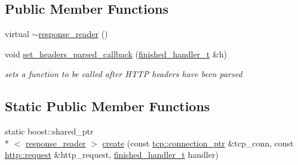 \subsection*{Public Member Functions}
\begin{DoxyCompactItemize}
\item 
virtual \hyperlink{classpion_1_1http_1_1response__reader_a4917191c842368a4be4c9e72927044ce}{$\sim$response\-\_\-reader} ()
\item 
void \hyperlink{classpion_1_1http_1_1response__reader_acbf0d25e943c1947a928970792b6a273}{set\-\_\-headers\-\_\-parsed\-\_\-callback} (\hyperlink{classpion_1_1http_1_1response__reader_a5ca8a2f566ad6c5f6c6ae264d557944e}{finished\-\_\-handler\-\_\-t} \&h)
\begin{DoxyCompactList}\small\item\em sets a function to be called after H\-T\-T\-P headers have been parsed \end{DoxyCompactList}\end{DoxyCompactItemize}
\subsection*{Static Public Member Functions}
\begin{DoxyCompactItemize}
\item 
static boost\-::shared\-\_\-ptr\\*
$<$ \hyperlink{classpion_1_1http_1_1response__reader}{response\-\_\-reader} $>$ \hyperlink{classpion_1_1http_1_1response__reader_af6fc5c10d090264225b72540c2c977b8}{create} (const \hyperlink{namespacepion_1_1tcp_a6c9b7497068009f6d81d95ec0b0627d6}{tcp\-::connection\-\_\-ptr} \&tcp\-\_\-conn, const \hyperlink{classpion_1_1http_1_1request}{http\-::request} \&http\-\_\-request, \hyperlink{classpion_1_1http_1_1response__reader_a5ca8a2f566ad6c5f6c6ae264d557944e}{finished\-\_\-handler\-\_\-t} handler)
\end{DoxyCompactItemize}
